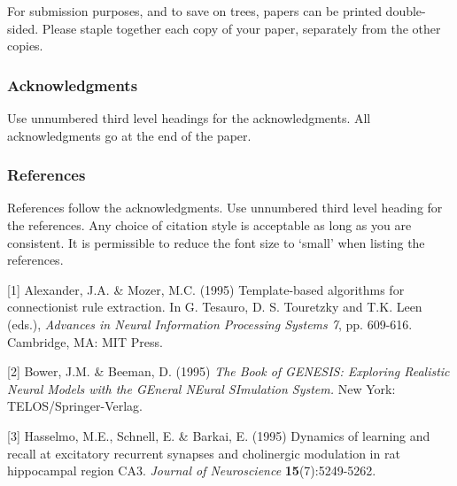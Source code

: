 For submission purposes, and to save on trees,
papers can be printed double-sided. Please staple
together each copy of your paper, separately from
the other copies.



\subsubsection*{Acknowledgments}

Use unnumbered third level headings for the acknowledgments.  All
acknowledgments go at the end of the paper.


\subsubsection*{References}

References follow the acknowledgments.  Use unnumbered third level
heading for the references.  Any choice of citation style is
acceptable as long as you are consistent. It is permissible 
to reduce the font size to `small' when listing the references. 

\small{
[1] Alexander, J.A. \& Mozer, M.C.  (1995) Template-based algorithms
for connectionist rule extraction.  In G. Tesauro, D. S. Touretzky
and T.K. Leen (eds.), {\it Advances in Neural Information Processing
Systems 7}, pp. 609-616.  Cambridge, MA: MIT Press.

[2] Bower, J.M. \& Beeman, D. (1995) {\it The Book of GENESIS: Exploring 
Realistic Neural Models with the GEneral NEural SImulation System.}
New York: TELOS/Springer-Verlag.

[3] Hasselmo, M.E., Schnell, E. \& Barkai, E. (1995) Dynamics of learning
and recall at excitatory recurrent synapses and cholinergic modulation
in rat hippocampal region CA3.  {\it Journal of Neuroscience}
{\bf 15}(7):5249-5262.
}


